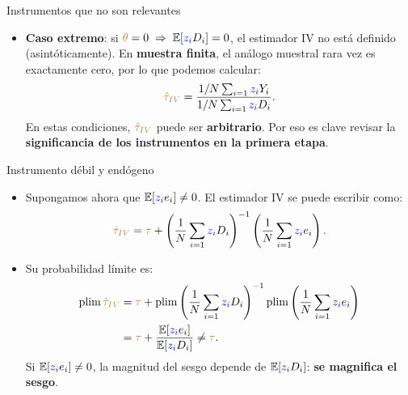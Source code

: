 \documentclass[10pt, xcolor=dvipsnames]{beamer}
\begin{document}
\begin{frame}{Instrumentos que no son relevantes}
\begin{itemize}
	\item \textbf{Caso extremo}: si $\textcolor{brown}{\theta}=0 \;\Rightarrow\; \operatorname{\mathbb{E}}[\textcolor{blue}{z_i}D_i]=0$, el estimador IV no está definido (asintóticamente). En \textbf{muestra finita}, el análogo muestral rara vez es exactamente cero, por lo que podemos calcular:
	\begin{align*}
	\begin{split}
	   \textcolor{brown}{\hat{\tau}_{IV}} = \frac{1/N\sum_{i=1} \textcolor{blue}{z_i} Y_i}{1/N\sum_{i=1} \textcolor{blue}{z_i} D_i}.
	\end{split}
	\end{align*}
    \smallspace
	En estas condiciones, $\textcolor{brown}{\hat{\tau}_{IV}}$ puede ser \textbf{arbitrario}. Por eso es clave revisar la \textbf{significancia de los instrumentos en la primera etapa}.
\end{itemize}	
\end{frame}


\begin{frame}{Instrumento débil y endógeno}
\begin{itemize}
	\item Supongamos ahora que $\operatorname{\mathbb{E}}[\textcolor{blue}{z_i}e_i]\neq0$. El estimador IV se puede escribir como:
	\begin{align*}
    \begin{split}
    \textcolor{brown}{\hat{\tau}_{IV}} &= \textcolor{brown}{\tau} + \left(\frac{1}{N}\sum_{i=1} \textcolor{blue}{z_i} D_i\right)^{-1}\left(\frac{1}{N}\sum_{i=1} \textcolor{blue}{z_i} e_i\right).  \\
    \end{split}
    \end{align*}
    \item Su probabilidad límite es:
	\begin{align*}
    \begin{split}
    \plim \brown{\hat{\tau}_{IV}} &= \brown{\tau} + \plim \left(\frac{1}{N}\sum_{i=1} \textcolor{blue}{z_i} D_i\right)^{-1} \plim \left(\frac{1}{N}\sum_{i=1} \textcolor{blue}{z_i} e_i\right)  \\
    &= \brown{\tau} + \frac{\EX[\textcolor{blue}{z_i}e_i]}{\EX[\textcolor{blue}{z_i} D_i]} \neq \brown{\tau}.
    \end{split}
    \end{align*}
	Si $\operatorname{\mathbb{E}}[\textcolor{blue}{z_i}e_i]\neq0$, la magnitud del sesgo depende de $\operatorname{\mathbb{E}}[\textcolor{blue}{z_i}D_i]$: \textbf{se magnifica el sesgo}.
\end{itemize}	
\end{frame}
\end{document}
